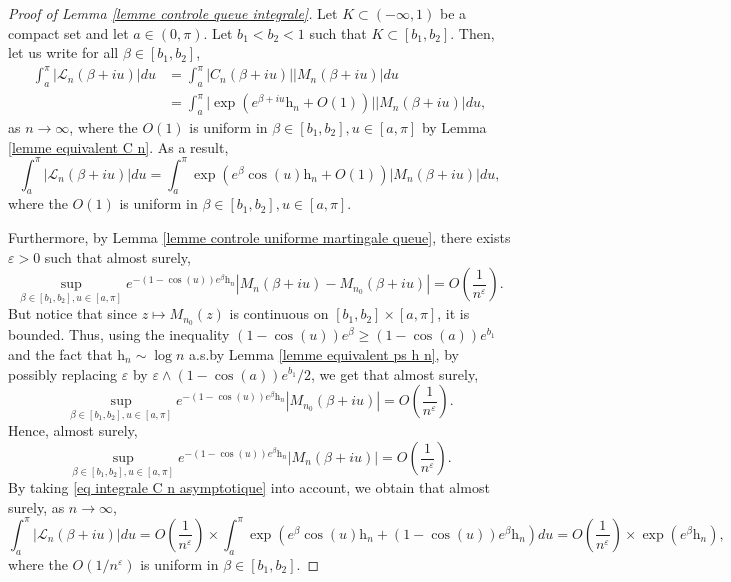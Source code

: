 \documentclass[11pt]{article}
\numberwithin{equation}{section}
\def\vp{\varepsilon}
\def \cL{\mathcal{L}}
\begin{document}
\begin{proof}[Proof of Lemma \ref{lemme controle queue integrale}]
	Let $K \subset (-\infty, 1)$ be a compact set and let $a \in (0, \pi)$. Let $b_1<b_2<1$ such that $K\subset [b_1, b_2]$. Then, let us write for all $\beta \in [b_1, b_2]$,
	\begin{align*}
		\int_a^\pi \vert \cL_n (\beta + iu)\vert du&= \int_a^\pi \vert C_n(\beta+ iu) \vert \vert M_n(\beta + iu ) \vert du\\
		&= \int_a^\pi  \vert \exp(e^{\beta + iu} \mathrm{h}_n + O(1)) \vert \vert M_n(\beta + iu ) \vert du,
	\end{align*}
	as $n\to \infty$, where the $O(1)$ is uniform in $\beta \in [b_1, b_2] , u \in [a, \pi]$ by Lemma \ref{lemme equivalent C n}. As a result,
	\begin{equation}\label{eq integrale C n asymptotique}
		\int_a^\pi \vert \cL_n (\beta + iu)\vert du =  \int_a^\pi  \exp(e^{\beta}\cos(u) \mathrm{h}_n + O(1))  \vert M_n(\beta + iu ) \vert du,
	\end{equation}
	where the $O(1)$ is uniform in $\beta \in [b_1, b_2] , u \in [a, \pi]$. 
	
	Furthermore, by Lemma \ref{lemme controle uniforme martingale queue}, there exists $\vp>0$ such that almost surely,
	\[ \sup_{\beta \in [b_1, b_2], u \in [a, \pi]} 
	e^{-(1-\cos(u))e^\beta \mathrm{h}_n} \left\vert M_n(\beta +iu)-M_{n_0}(\beta +iu) \right\vert  = O\left( \frac{1}{n^\vp}\right).
	\]
	But notice that since $z \mapsto M_{n_0}(z)$ is continuous on $[b_1, b_2]\times [a, \pi]$, it is bounded. Thus, using the inequality $(1-\cos(u))e^\beta \ge (1- \cos(a))e^{b_1}$ and the fact that $\mathrm{h}_n \sim \log n$ a.s.\@ by Lemma \ref{lemme equivalent ps h n}, by possibly replacing $\vp$ by $\vp \wedge (1-\cos(a))e^{b_1}/2$, we get that almost surely,
	\[ \sup_{\beta \in [b_1, b_2], u \in [a, \pi]} 
	e^{-(1-\cos(u))e^\beta \mathrm{h}_n} \left\vert M_{n_0}(\beta +iu) \right\vert  = O\left( \frac{1}{n^\vp}\right).
	\]
	Hence, almost surely,
	\[
	 \sup_{\beta \in [b_1, b_2], u \in [a, \pi]} 
	e^{-(1-\cos(u))e^\beta \mathrm{h}_n} \left\vert M_n(\beta +iu) \right\vert  = O\left( \frac{1}{n^\vp}\right).
	\]
	By taking \eqref{eq integrale C n asymptotique} into account, we obtain that almost surely, as $n\to \infty$,
	\[
	\int_a^\pi \vert \cL_n (\beta + iu)\vert du =  O\left( \frac{1}{n^\vp}\right) \times \int_a^\pi  \exp(e^{\beta}\cos(u) \mathrm{h}_n +(1-\cos(u))e^\beta \mathrm{h}_n )   du = O\left(\frac{1}{n^\vp}\right) \times \exp\left(e^\beta \mathrm{h}_n\right),
	\]
	where the $O(1/n^\vp)$ is uniform in $\beta \in [b_1, b_2]$.
\end{proof}
\end{document}
